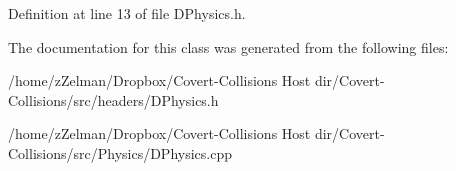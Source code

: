 Definition at line 13 of file D\-Physics.\-h.



The documentation for this class was generated from the following files\-:\begin{DoxyCompactItemize}
\item 
/home/z\-Zelman/\-Dropbox/\-Covert-\/\-Collisions Host dir/\-Covert-\/\-Collisions/src/headers/D\-Physics.\-h\item 
/home/z\-Zelman/\-Dropbox/\-Covert-\/\-Collisions Host dir/\-Covert-\/\-Collisions/src/\-Physics/D\-Physics.\-cpp\end{DoxyCompactItemize}
